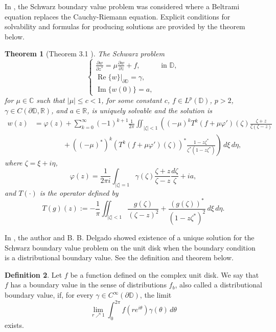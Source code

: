 \documentclass[12pt,reqno]{amsart}
\newtheorem{theorem}{Theorem}[section]
\theoremstyle{definition}
\newtheorem{deff}[theorem]{Definition}
\theoremstyle{remark}
\newcommand{\R}{\mathbb R}
\newcommand{\p}{\partial}
\DeclareMathOperator{\im}{Im}
\DeclareMathOperator{\re}{Re}
\newcommand{\disk}{\mathbb{D}}
\begin{document}
    In \cite{BeltramiSchwarz}, the Schwarz boundary value problem was considered where a Beltrami equation replaces the Cauchy-Riemann equation. Explicit conditions for solvability and formulas for producing solutions are provided by the theorem below.

    \begin{theorem}[Theorem 3.1 \cite{BeltramiSchwarz}]\label{thm: beltramischwarz}
        The Schwarz problem 
        \[
            \begin{cases}
                \frac{\p w}{\p z^*} = \mu \frac{\p w}{\p z} + f, & \text{ in } \disk,\\
                \re\{w\}|_{\p\disk} = \gamma, \\
                \im\{w(0)\} = a,
            \end{cases}
        \]
        for $\mu \in \mathbb{C}$ such that $|\mu| \leq c < 1$, for some constant $c$, $f \in L^p(\disk)$, $p >2$, $\gamma \in C(\p \disk,\R)$, and $a \in \R$, is uniquely solvable and the solution is 
        \begin{align*}
            w(z) 
            &= \varphi(z) 
            + \sum_{k=0}^\infty (-1)^{k+1} \frac{1}{2\pi} \iint_{|\zeta|<1} \left( (-\mu)^k T^k(f+\mu\varphi')(\zeta)\frac{\zeta + z}{\zeta(\zeta -z)} \right.\\
            &\quad\quad\quad\quad +  \left. ((-\mu)^*)^k (T^k(f+\mu\varphi')(\zeta))^*\frac{1-z \zeta^*}{\zeta^*(1-z\zeta^*)} \right)\,d\xi\,d\eta,
        \end{align*}
        where $\zeta = \xi + i \eta$,
        \[
            \varphi(z) = \frac{1}{2\pi i} \int_{|\zeta|=1} \gamma(\zeta) \frac{\zeta + z}{\zeta -z} \frac{d\zeta}{\zeta} + ia,
        \]
        and $T(\cdot)$ is the operator defined by
        \[
            T(g)(z) := -\frac{1}{\pi} \iint_{|\zeta|<1} \frac{g(\zeta)}{(\zeta - z)^2} + \frac{(g(\zeta))^*}{(1-z\zeta^*)^2}\,d\xi\,d\eta.
        \]
    \end{theorem}

  

    In \cite{WBD}, the author and B. B. Delgado showed existence of a unique solution for the Schwarz boundary value problem on the unit disk when the boundary condition is a distributional boundary value. See the definition and theorem below. 

    \begin{deff}\label{bvcircle} Let $f$ be a function defined on the complex unit disk. We say that $f$ has a boundary value in the sense of distributions $f_b$, also called a distributional boundary value, if, for every $\gamma \in C^\infty(\p \disk)$, the limit
    \[
        \lim_{r \nearrow 1} \int_0^{2\pi} f(re^{i\theta}) \gamma(\theta) \,d\theta 
    \]
    exists. 
\end{deff}
\end{document}
